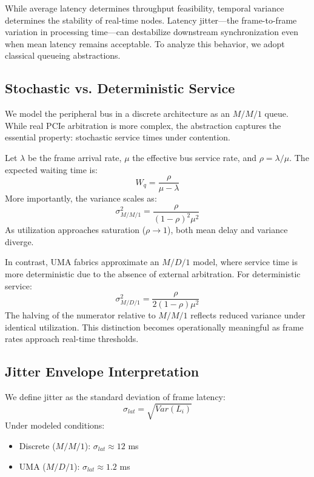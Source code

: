 \documentclass[conference]{IEEEtran}
\begin{document}
While average latency determines throughput feasibility, temporal variance determines the stability of real-time nodes. Latency jitter---the frame-to-frame variation in processing time---can destabilize downstream synchronization even when mean latency remains acceptable. To analyze this behavior, we adopt classical queueing abstractions.

\subsection{Stochastic vs. Deterministic Service}
We model the peripheral bus in a discrete architecture as an $M/M/1$ queue. While real PCIe arbitration is more complex, the abstraction captures the essential property: stochastic service times under contention.

Let $\lambda$ be the frame arrival rate, $\mu$ the effective bus service rate, and $\rho = \lambda / \mu$. The expected waiting time is:
\begin{equation}
W_q = \frac{\rho}{\mu - \lambda}
\end{equation}
More importantly, the variance scales as:
\begin{equation}
\sigma^2_{M/M/1} = \frac{\rho}{(1-\rho)^2 \mu^2}
\end{equation}
As utilization approaches saturation ($\rho \to 1$), both mean delay and variance diverge.

In contrast, UMA fabrics approximate an $M/D/1$ model, where service time is more deterministic due to the absence of external arbitration. For deterministic service:
\begin{equation}
\sigma^2_{M/D/1} = \frac{\rho}{2(1-\rho) \mu^2}
\end{equation}
The halving of the numerator relative to $M/M/1$ reflects reduced variance under identical utilization. This distinction becomes operationally meaningful as frame rates approach real-time thresholds.

\subsection{Jitter Envelope Interpretation}
We define jitter as the standard deviation of frame latency:
\begin{equation}
\sigma_{lat} = \sqrt{Var(L_i)}
\end{equation}
Under modeled conditions:
\begin{itemize}
    \item Discrete ($M/M/1$): $\sigma_{lat} \approx 12$ ms
    \item UMA ($M/D/1$): $\sigma_{lat} \approx 1.2$ ms
\end{itemize}
\end{document}
